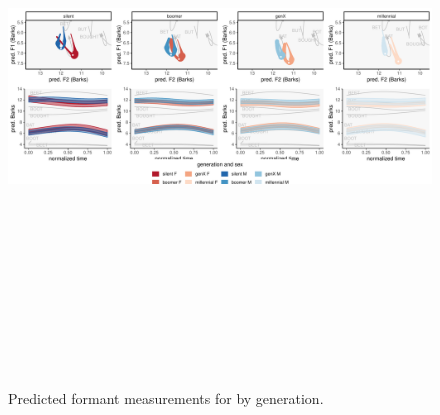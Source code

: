 \begin{figure}[p]
	\centering
	\includegraphics[angle = 90, origin = c, height = 6in]{Figures/BAT/BAT_sex_panel_plot_wide.pdf}
	\caption[Predicted formant measurements for \bat by generation.]{Predicted formant measurements for \bat by generation.}
	\label{fig:BAT_sex_panel_plot_wide}
\end{figure}

